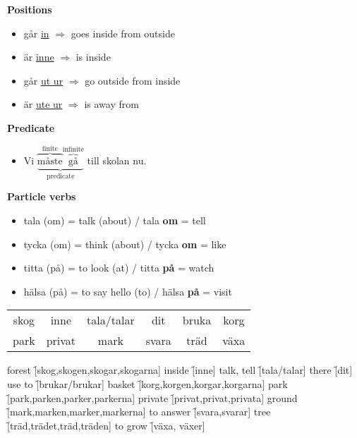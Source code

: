 
\begin{flushleft}
    \textbf{Positions}
    \begin{itemize}
        \item går \underline{in} $\Rightarrow$ goes inside from outside
        \item är \underline{inne} $\Rightarrow$ is inside
        \item går \underline{\underline{ut} ur} $\Rightarrow$ go outside from inside
        \item är \underline{\underline{ute} ur} $\Rightarrow$ is away from
    \end{itemize}

    \textbf{Predicate}
    \begin{itemize}
        \item Vi
        $\underbrace{
            \overbrace{\text{måste}}^{\text{finite}} 
            \overbrace{\text{gå}}^{\text{infinite}}
        }_{\text{predicate}}$
        till skolan nu.
    \end{itemize}

    \textbf{Particle verbs}
    \begin{itemize}
        \item tala (om) = talk (about) / tala \textbf{om} = tell
        \item tycka (om) = think (about) / tycka \textbf{om} = like
        \item titta (på) = to look (at) / titta \textbf{på} = watch
        \item hälsa (på) = to say hello (to) / hälsa \textbf{på} = visit
    \end{itemize}
\end{flushleft}

\begin{center}
    \begin{tabular}{|c c c c c c|}
        \hline
        skog & inne & tala/talar & dit & bruka & korg \\
        park & privat & mark & svara & träd & växa \\
        \hline
    \end{tabular}
\end{center}

\begin{questions}
    \begin{multicols}{2}
        \raggedcolumns
        \question forest \f[skog,skogen,skogar,skogarna]
        \question inside \f[inne]
        \question talk, tell \f[tala/talar]
        \question there \f[dit]
        \question use to \f[brukar/brukar] 
        \question basket \f[korg,korgen,korgar,korgarna]
        \question park \f[park,parken,parker,parkerna]
        \question private \f[privat,privat,privata]
        \question ground \f[mark,marken,marker,markerna]
        \question to answer \f[svara,svarar]
        \question tree \f[träd,trädet,träd,träden]
        \question to grow \f[växa, växer]
    \end{multicols}
\end{questions}